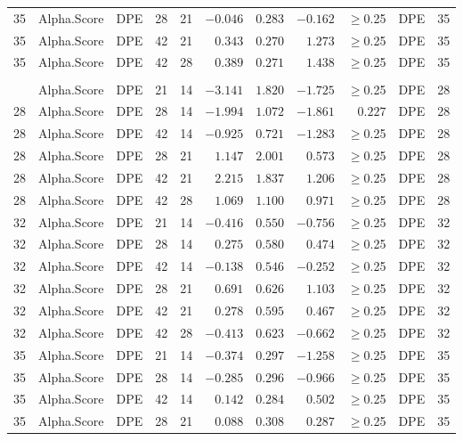\documentclass[
]{article}
\begin{document}
\begin{longtable}{cllrrrrrrlc}
35 & Alpha.Score & DPE & 28 & 21 & $-0.046$ & $0.283$ & $-0.162$ & $\geq$0.25 & DPE & 35 \\ 
35 & Alpha.Score & DPE & 42 & 21 & $0.343$ & $0.270$ & $1.273$ & $\geq$0.25 & DPE & 35 \\ 
35 & Alpha.Score & DPE & 42 & 28 & $0.389$ & $0.271$ & $1.438$ & $\geq$0.25 & DPE & 35 \\ 
\midrule\addlinespace[2.5pt]
\multicolumn{11}{l}{Simpson} \\ 
\midrule\addlinespace[2.5pt]
28 & Alpha.Score & DPE & 21 & 14 & $-3.141$ & $1.820$ & $-1.725$ & $\geq$0.25 & DPE & 28 \\ 
28 & Alpha.Score & DPE & 28 & 14 & $-1.994$ & $1.072$ & $-1.861$ & $0.227$ & DPE & 28 \\ 
28 & Alpha.Score & DPE & 42 & 14 & $-0.925$ & $0.721$ & $-1.283$ & $\geq$0.25 & DPE & 28 \\ 
28 & Alpha.Score & DPE & 28 & 21 & $1.147$ & $2.001$ & $0.573$ & $\geq$0.25 & DPE & 28 \\ 
28 & Alpha.Score & DPE & 42 & 21 & $2.215$ & $1.837$ & $1.206$ & $\geq$0.25 & DPE & 28 \\ 
28 & Alpha.Score & DPE & 42 & 28 & $1.069$ & $1.100$ & $0.971$ & $\geq$0.25 & DPE & 28 \\ 
32 & Alpha.Score & DPE & 21 & 14 & $-0.416$ & $0.550$ & $-0.756$ & $\geq$0.25 & DPE & 32 \\ 
32 & Alpha.Score & DPE & 28 & 14 & $0.275$ & $0.580$ & $0.474$ & $\geq$0.25 & DPE & 32 \\ 
32 & Alpha.Score & DPE & 42 & 14 & $-0.138$ & $0.546$ & $-0.252$ & $\geq$0.25 & DPE & 32 \\ 
32 & Alpha.Score & DPE & 28 & 21 & $0.691$ & $0.626$ & $1.103$ & $\geq$0.25 & DPE & 32 \\ 
32 & Alpha.Score & DPE & 42 & 21 & $0.278$ & $0.595$ & $0.467$ & $\geq$0.25 & DPE & 32 \\ 
32 & Alpha.Score & DPE & 42 & 28 & $-0.413$ & $0.623$ & $-0.662$ & $\geq$0.25 & DPE & 32 \\ 
35 & Alpha.Score & DPE & 21 & 14 & $-0.374$ & $0.297$ & $-1.258$ & $\geq$0.25 & DPE & 35 \\ 
35 & Alpha.Score & DPE & 28 & 14 & $-0.285$ & $0.296$ & $-0.966$ & $\geq$0.25 & DPE & 35 \\ 
35 & Alpha.Score & DPE & 42 & 14 & $0.142$ & $0.284$ & $0.502$ & $\geq$0.25 & DPE & 35 \\ 
35 & Alpha.Score & DPE & 28 & 21 & $0.088$ & $0.308$ & $0.287$ & $\geq$0.25 & DPE & 35 \\ 

\end{longtable}
\end{document}
